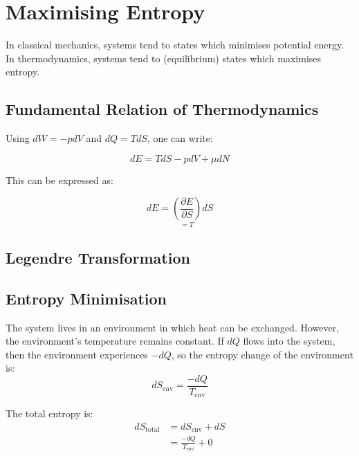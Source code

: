 \documentclass[12pt]{article}
\begin{document}
\section{Maximising Entropy}

In classical mechanics, systems tend to states which minimises potential energy. In thermodynamics, systems tend to (equilibrium) states which maximises entropy.

\subsection{Fundamental Relation of Thermodynamics}

Using $dW = -pdV$ and $dQ = TdS$, one can write:

\[\boxed{dE = TdS - pdV + \mu dN}\]

This can be expressed as:

\[
dE = \underset{=T}{\left(\frac{\partial E}{\partial S}\right)}dS

\]
\subsection{Legendre Transformation}




\subsection{Entropy Minimisation}
The system lives in an environment in which heat can be exchanged. However, the environment's temperature remains constant. If $dQ$ flows into the system, then the environment experiences $-dQ$, so the entropy change of the environment is:
\[ dS_\text{env} = \frac{-dQ}{T_\text{env}}\]

The total entropy is:
\begin{align*}
    dS_\text{total} &= dS_\text{env} + dS\\
    &= \frac{-dQ}{T_\text{env}}+0\\
\end{align*}
\end{document}
